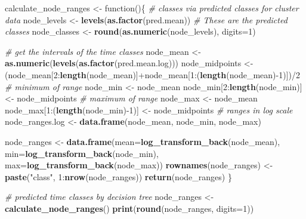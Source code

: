 \documentclass[]{article}
\newenvironment{Shaded}{\begin{snugshade}}{\end{snugshade}}
\newcommand{\KeywordTok}[1]{\textcolor[rgb]{0.13,0.29,0.53}{\textbf{{#1}}}}
\newcommand{\DataTypeTok}[1]{\textcolor[rgb]{0.13,0.29,0.53}{{#1}}}
\newcommand{\DecValTok}[1]{\textcolor[rgb]{0.00,0.00,0.81}{{#1}}}
\newcommand{\StringTok}[1]{\textcolor[rgb]{0.31,0.60,0.02}{{#1}}}
\newcommand{\CommentTok}[1]{\textcolor[rgb]{0.56,0.35,0.01}{\textit{{#1}}}}
\newcommand{\NormalTok}[1]{{#1}}
\begin{document}
\begin{Shaded}
\begin{Highlighting}[]
\NormalTok{calculate_node_ranges <-}\StringTok{ }\NormalTok{function()\{}
  \CommentTok{# classes via predicted classes for cluster data}
  \NormalTok{node_levels <-}\StringTok{ }\KeywordTok{levels}\NormalTok{(}\KeywordTok{as.factor}\NormalTok{(pred.mean))}
  \CommentTok{# These are the predicted classes}
  \NormalTok{node_classes <-}\StringTok{ }\KeywordTok{round}\NormalTok{(}\KeywordTok{as.numeric}\NormalTok{(node_levels), }\DataTypeTok{digits=}\DecValTok{1}\NormalTok{)}
  
  \CommentTok{# get the intervals of the time classes}
  \NormalTok{node_mean <-}\StringTok{ }\KeywordTok{as.numeric}\NormalTok{(}\KeywordTok{levels}\NormalTok{(}\KeywordTok{as.factor}\NormalTok{(pred.mean.log)))}
  \NormalTok{node_midpoints <-}\StringTok{ }\NormalTok{(node_mean[}\DecValTok{2}\NormalTok{:}\KeywordTok{length}\NormalTok{(node_mean)]+node_mean[}\DecValTok{1}\NormalTok{:(}\KeywordTok{length}\NormalTok{(node_mean)-}\DecValTok{1}\NormalTok{)])/}\DecValTok{2}
  \CommentTok{# minimum of range}
  \NormalTok{node_min <-}\StringTok{ }\NormalTok{node_mean}
  \NormalTok{node_min[}\DecValTok{2}\NormalTok{:}\KeywordTok{length}\NormalTok{(node_min)] <-}\StringTok{ }\NormalTok{node_midpoints}
  \CommentTok{# maximum of range}
  \NormalTok{node_max <-}\StringTok{ }\NormalTok{node_mean}
  \NormalTok{node_max[}\DecValTok{1}\NormalTok{:(}\KeywordTok{length}\NormalTok{(node_min)-}\DecValTok{1}\NormalTok{)] <-}\StringTok{ }\NormalTok{node_midpoints}
  \CommentTok{# ranges in log scale}
  \NormalTok{node_ranges.log <-}\StringTok{ }\KeywordTok{data.frame}\NormalTok{(node_mean, node_min, node_max)}
  
  \NormalTok{node_ranges <-}\StringTok{ }\KeywordTok{data.frame}\NormalTok{(}\DataTypeTok{mean=}\KeywordTok{log_transform_back}\NormalTok{(node_mean), }
                            \DataTypeTok{min=}\KeywordTok{log_transform_back}\NormalTok{(node_min),}
                            \DataTypeTok{max=}\KeywordTok{log_transform_back}\NormalTok{(node_max))}
  \KeywordTok{rownames}\NormalTok{(node_ranges) <-}\StringTok{ }\KeywordTok{paste}\NormalTok{(}\StringTok{"class"}\NormalTok{, }\DecValTok{1}\NormalTok{:}\KeywordTok{nrow}\NormalTok{(node_ranges))}
  \KeywordTok{return}\NormalTok{(node_ranges)}
\NormalTok{\}}

\CommentTok{# predicted time classes by decision tree}
\NormalTok{node_ranges <-}\StringTok{ }\KeywordTok{calculate_node_ranges}\NormalTok{()}
\KeywordTok{print}\NormalTok{(}\KeywordTok{round}\NormalTok{(node_ranges, }\DataTypeTok{digits=}\DecValTok{1}\NormalTok{))}
\end{Highlighting}
\end{Shaded}
\end{document}
